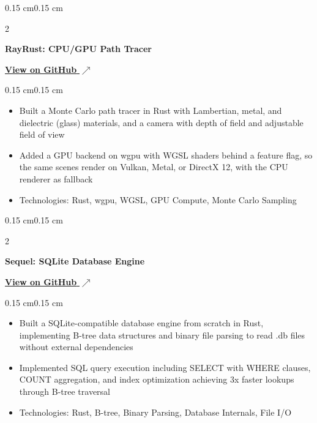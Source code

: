\documentclass[10pt, letterpaper]{article}
\newcommand{\githublink}[2]{\href{#1}{#2 $\nearrow$}}
\newenvironment{highlights}{
    \begin{itemize}[
        topsep=0.08 cm,
        parsep=0.05 cm,
        partopsep=0pt,
        itemsep=0pt,
        leftmargin=0.4 cm
    ]
}{
    \end{itemize}
}
\newenvironment{onecolentry}{
    \begin{adjustwidth}{0.15 cm}{0.15 cm}
}{
    \end{adjustwidth}
}
\newenvironment{twocolentry}[2][]{
    \onecolentry
    \def\secondColumn{#2}
    \setcolumnwidth{\fill, 4.5 cm}
    \begin{paracol}{2}
}{
    \switchcolumn \raggedleft \secondColumn
    \end{paracol}
    \endonecolentry
}
\begin{document}
        \vspace{0.15 cm}
    
        \begin{twocolentry}{
            \githublink{https://github.com/yuann3/RayRust}{\textbf{View on GitHub}}
        }
            \textbf{RayRust: CPU/GPU Path Tracer}
        \end{twocolentry}
        \vspace{0.08 cm}
        \begin{onecolentry}
            \begin{highlights}
                \item Built a Monte Carlo path tracer in Rust with Lambertian, metal, and dielectric (glass) materials, and a camera with depth of field and adjustable field of view
                \item Added a GPU backend on wgpu with WGSL shaders behind a feature flag, so the same scenes render on Vulkan, Metal, or DirectX 12, with the CPU renderer as fallback
                \item Technologies: Rust, wgpu, WGSL, GPU Compute, Monte Carlo Sampling
            \end{highlights}
        \end{onecolentry}

        \vspace{0.15 cm}

        \begin{twocolentry}{
            \githublink{https://github.com/yuann3/sequel/}{\textbf{View on GitHub}}
        }
            \textbf{Sequel: SQLite Database Engine}
        \end{twocolentry}
        \vspace{0.08 cm}
        \begin{onecolentry}
            \begin{highlights}
                \item Built a SQLite-compatible database engine from scratch in Rust, implementing B-tree data structures and binary file parsing to read .db files without external dependencies
                \item Implemented SQL query execution including SELECT with WHERE clauses, COUNT aggregation, and index optimization achieving 3x faster lookups through B-tree traversal
                \item Technologies: Rust, B-tree, Binary Parsing, Database Internals, File I/O
            \end{highlights}
        \end{onecolentry}
\end{document}
